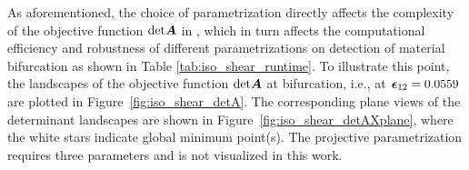 \documentclass[12pt]{article}
\numberwithin{equation}{section}
\begin{document}
As aforementioned, the choice of parametrization directly affects the 
complexity of the objective function ${\rm det}{\boldsymbol{A}}$ in 
, which in turn affects the 
computational efficiency and robustness of different parametrizations 
on detection of material bifurcation as shown in 
Table \ref{tab:iso_shear_runtime}. To illustrate this point, the 
landscapes of the objective function ${\rm det}{\boldsymbol{A}}$ at bifurcation, 
i.e., at ${\boldsymbol{\epsilon}}_{12}=0.0559$ are plotted in 
Figure~\ref{fig:iso_shear_detA}. The corresponding plane views of the 
determinant landscapes are shown in 
Figure~\ref{fig:iso_shear_detAXplane}, where the white stars indicate 
global minimum point(s). The projective parametrization requires three parameters and is not visualized in this work.

\begin{figure}[H]
   \centering {}  
\end{figure}
\end{document}
